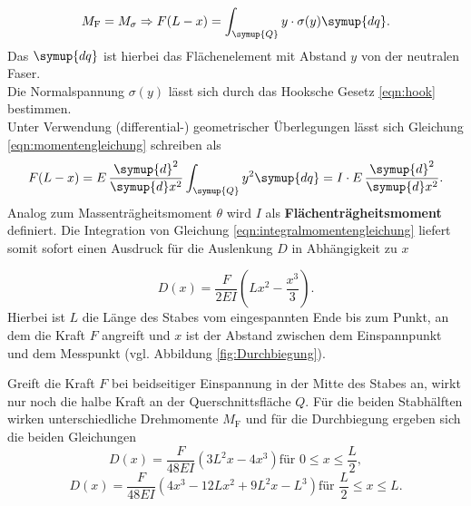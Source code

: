 \begin{equation}
	\label{eqn:momentengleichung}
	M_{\mathrm{F}}=M_{\mathrm{\sigma}} \Rightarrow F(L-x)=\int_{\symup{Q}}^{} y \cdot \sigma(y) \symup{dq} \mathrm{.}
\end{equation}
Das $\symup{dq}$ ist hierbei das Flächenelement mit Abstand $y$ von der neutralen Faser. \\
Die Normalspannung $\sigma(y)$ lässt sich durch das Hooksche Gesetz \eqref{eqn:hook} bestimmen.\\
Unter Verwendung (differential-) geometrischer Überlegungen lässt sich Gleichung \eqref{eqn:momentengleichung} schreiben als
\begin{equation}
	\label{eqn:integralmomentengleichung}
	F(L-x)=E \, \frac{\symup{d}^2}{\symup{d}x^2} \int_{\symup{Q}}^{} y^2 \symup{dq}=I \cdot E\, \frac{\symup{d}^2}{\symup{d}x^2} \mathrm{.}
\end{equation}
Analog zum Massenträgheitsmoment $\theta$ wird $I$ als \textbf{Flächenträgheitsmoment} definiert.
Die Integration von Gleichung  \eqref{eqn:integralmomentengleichung} liefert somit sofort einen Ausdruck für die Auslenkung $D$ in Abhängigkeit zu $x$

\begin{equation}
	\label{eqn:d_x_einseitig}
	D(x)=\frac{F}{2EI}\left(Lx^2-\frac{x^3}{3}\right) \text{.}
\end{equation}
Hierbei ist $L$ die Länge des Stabes vom eingespannten Ende bis zum Punkt, an dem die Kraft $F$ angreift und $x$ ist der Abstand zwischen dem Einspannpunkt und dem Messpunkt (vgl. Abbildung \ref{fig:Durchbiegung}).

Greift die Kraft $F$ bei beidseitiger Einspannung in der Mitte des Stabes an, wirkt nur noch die halbe Kraft an der Querschnittsfläche $Q$. Für die beiden Stabhälften wirken unterschiedliche Drehmomente $M_{\mathrm{F}}$ und für die Durchbiegung ergeben sich die beiden Gleichungen
\begin{equation}
	\label{eqn:d_x_beidseitig_eins}
	D(x)=\frac{F}{48EI}\left(3L^2x-4x^3\right) \mathrm{ für }\,\, 0\leq x\leq\frac{L}{2} \mathrm{,}
\end{equation}
\begin{equation}
	\label{eqn:d_x_beidseitig_zwei}
	D(x)=\frac{F}{48EI}\left(4x^3-12 Lx^2+9 L^2x-L^3\right) \mathrm{ für }\,\, \frac{L}{2}\leq x \leq L \mathrm{.}
\end{equation}

